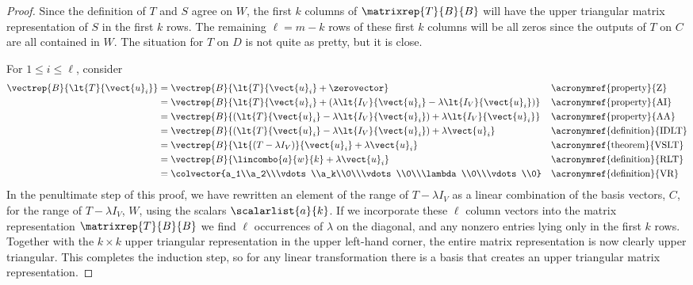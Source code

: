 \begin{proof}
%
Since the definition of $T$ and $S$ agree on $W$,  the first $k$ columns of $\matrixrep{T}{B}{B}$ will have the upper triangular matrix representation of $S$ in the first $k$ rows.  The remaining $\ell=m-k$ rows of these first $k$ columns will be all zeros since the outputs of $T$ on $C$ are all contained in $W$.  The situation for $T$ on $D$ is not quite as pretty, but it is close.\par
%
For $1\leq i\leq\ell$, consider 
%
\begin{align*}
\vectrep{B}{\lt{T}{\vect{u}_i}}
&=\vectrep{B}{\lt{T}{\vect{u}_i}+\zerovector}&&\text{\acronymref{property}{Z}}\\
%
&=\vectrep{B}{\lt{T}{\vect{u}_i}+\left(\lambda\lt{I_V}{\vect{u}_i}-\lambda\lt{I_V}{\vect{u}_i}\right)}&&\text{\acronymref{property}{AI}}\\
%
&=\vectrep{B}{\left(\lt{T}{\vect{u}_i}-\lambda\lt{I_V}{\vect{u}_i}\right)+\lambda\lt{I_V}{\vect{u}_i}}&&\text{\acronymref{property}{AA}}\\
%
&=\vectrep{B}{\left(\lt{T}{\vect{u}_i}-\lambda\lt{I_V}{\vect{u}_i}\right)+\lambda\vect{u}_i}&&\text{\acronymref{definition}{IDLT}}\\
%
&=\vectrep{B}{\lt{\left(T-\lambda I_V\right)}{\vect{u}_i}+\lambda\vect{u}_i}
&&\text{\acronymref{theorem}{VSLT}}\\
%
&=\vectrep{B}{\lincombo{a}{w}{k}+\lambda\vect{u}_i}
&&\text{\acronymref{definition}{RLT}}\\
%
&=\colvector{a_1\\a_2\\\vdots\\a_k\\0\\\vdots\\0\\\lambda\\0\\\vdots\\0}
&&\text{\acronymref{definition}{VR}}
%
\end{align*}
%
In the penultimate step of this proof, we have rewritten an element of the range of $T-\lambda I_V$ as a linear combination of the basis vectors, $C$, for the range of $T-\lambda I_V$, $W$, using the scalars $\scalarlist{a}{k}$.  If we incorporate these $\ell$ column vectors into the matrix representation $\matrixrep{T}{B}{B}$ we find $\ell$ occurrences of $\lambda$ on the diagonal, and any nonzero entries lying only in the first $k$ rows.  Together with the $k\times k$ upper triangular representation in the upper left-hand corner, the entire matrix representation is now clearly upper triangular.  This completes the induction step, so for any linear transformation there is a basis that creates an upper triangular matrix representation.\par

\end{proof}
